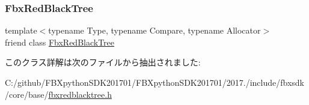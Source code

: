 \subsubsection{\texorpdfstring{Fbx\+Red\+Black\+Tree}{FbxRedBlackTree}}
{\footnotesize\ttfamily template$<$typename Type, typename Compare, typename Allocator$>$ \\
friend class \hyperlink{class_fbx_red_black_tree}{Fbx\+Red\+Black\+Tree}\hspace{0.3cm}{\ttfamily [friend]}}



このクラス詳解は次のファイルから抽出されました\+:\begin{DoxyCompactItemize}
\item 
C\+:/github/\+F\+B\+Xpython\+S\+D\+K201701/\+F\+B\+Xpython\+S\+D\+K201701/2017./include/fbxsdk/core/base/\hyperlink{fbxredblacktree_8h}{fbxredblacktree.\+h}\end{DoxyCompactItemize}
